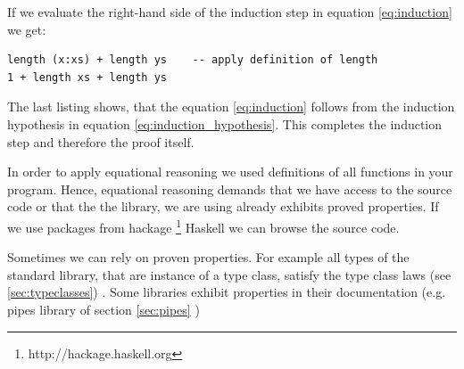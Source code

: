 \begin{description}
If we evaluate the right-hand side of the induction step in equation  \ref{eq:induction} we get:
\begin{program}
\begin{verbatim}
length (x:xs) + length ys    -- apply definition of length
1 + length xs + length ys
\end{verbatim}
\end{program}

The last listing shows, that the equation \ref{eq:induction} follows from the induction hypothesis in equation \ref{eq:induction_hypothesis}. This completes the induction step and therefore the proof itself.
\end{description}

In order to apply equational reasoning we used definitions of all functions in your program. Hence, equational reasoning demands that we have access to the source code or that the the library, we are using already exhibits proved properties. If we use packages from hackage \footnote{http://hackage.haskell.org} Haskell we can browse the source code. 

Sometimes we can rely on proven properties. For example all types of the standard library, that are instance of a type class, satisfy the type class laws (see \ref{sec:typeclasses}) \cite{yorgey}. Some libraries exhibit properties in their documentation (e.g. pipes library of section \ref{sec:pipes} \cite{gonzales13})